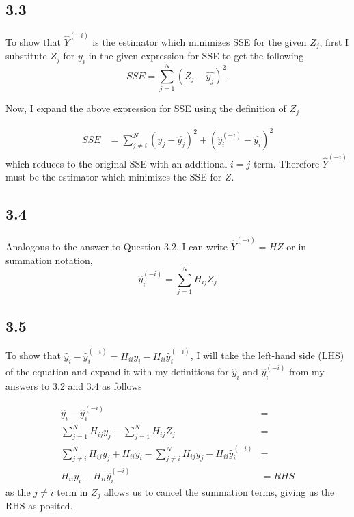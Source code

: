 \documentclass[12pt]{amsart}
\begin{document}
\subsection*{3.3}

To show that $\hat{Y}^{(-i)}$ is the estimator which minimizes SSE for the given $Z_j$, first I substitute $Z_j$ for $y_i$ in the given expression for SSE to get the following
\begin{equation}
SSE = \sum_{j=1}^N (Z_j - \hat{y_j})^2.
\end{equation} 

Now, I expand the above expression for SSE using the definition of $Z_j$

\begin{equation}
\begin{split}
SSE & = \sum_{j \neq i}^N (y_j - \hat{y_j})^2  + (\hat{y}_i^{(-i)} - \hat{y_i})^2
\end{split}
\end{equation}
which reduces to the original SSE with an additional $i = j$ term.  Therefore $\hat{Y}^{(-i)}$ must be the estimator which minimizes the SSE for $Z$.

\subsection*{3.4}

Analogous to the answer to Question 3.2, I can write $\hat{Y}^{(-i)} = HZ$ or in summation notation,
\begin{equation}
\hat{y}_i^{(-i)} = \sum_{j = 1}^N H_{ij}Z_j
\end{equation}

\subsection*{3.5}

To show that $\hat{y}_i - \hat{y}_i^{(-i)} = H_{ii}y_i - H_{ii}\hat{y}_i^{(-i)} $, I will take the left-hand side (LHS) of the equation and expand it with my definitions for $\hat{y}_i $ and $\hat{y}_i^{(-i)}$ from my answers to 3.2 and 3.4 as follows

\begin{equation}
\begin{split}
\hat{y}_i - \hat{y}_i^{(-i)}  & = \\
\sum_{j = 1}^N H_{ij}y_j - \sum_{j = 1}^N H_{ij}Z_j & = \\
\sum_{j \neq i}^N H_{ij}y_j + H_{ii}y_i - \sum_{j \neq i}^N H_{ij}y_j - H_{ii}\hat{y}_i^{(-i)} & = \\
H_{ii}y_i - H_{ii}\hat{y}_i^{(-i)} & = RHS
\end{split}
\end{equation}
as the $j \neq i$ term in $Z_j$ allows us to cancel the summation terms, giving us the RHS as posited.
\end{document}
